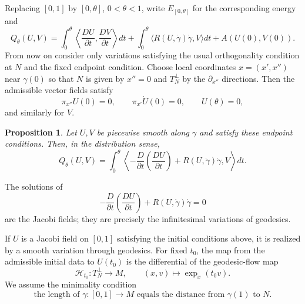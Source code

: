 \documentclass[11pt,a4paper]{article}
\numberwithin{equation}{section}
\newtheorem{proposition}[theorem]{Proposition}
\theoremstyle{remark}
\begin{document}
Replacing $[0,1]$ by $[0,\theta]$, $0<\theta<1$, write $E_{[0,\theta]}$ for the corresponding energy and
\begin{equation}
Q_\theta(U,V)=
\int_0^\theta\left\langle\frac{D U}{\partial t},\frac{D V}{\partial t}\right\rangle dt
+\int_0^\theta\langle R(U,\dot\gamma)\dot\gamma,V\rangle dt
+A(U(0),V(0)).
\tag{6.4}
\end{equation}
From now on consider only variations satisfying the usual orthogonality condition at $N$ and the fixed endpoint condition. Choose local coordinates $x=(x',x'')$ near $\gamma(0)$ so that $N$ is given by $x''=0$ and $T_N^\perp$ by the $\partial_{x''}$ directions. Then the admissible vector fields satisfy
\[
\pi_{x''}U(0)=0,
\qquad \pi_{x'}\dot U(0)=0,
\qquad U(\theta)=0,
\]
and similarly for $V$.

\begin{proposition}
Let $U,V$ be piecewise smooth along $\gamma$ and satisfy these endpoint conditions. Then, in the distribution sense,
\begin{equation}
Q_\theta(U,V)=
\int_0^\theta
\left\langle
-\frac{D}{\partial t}\left(\frac{DU}{\partial t}\right)
+R(U,\dot\gamma)\dot\gamma,
V\right\rangle dt.
\tag{6.4$'$}
\end{equation}
\end{proposition}
The solutions of
\begin{equation}
-\frac{D}{\partial t}\left(\frac{DU}{\partial t}\right)
+R(U,\dot\gamma)\dot\gamma=0
\tag{6.5}
\end{equation}
are the Jacobi fields; they are precisely the infinitesimal variations of geodesics.

If $U$ is a Jacobi field on $[0,1]$ satisfying the initial conditions above, it is realized by a smooth variation through geodesics. For fixed $t_0$, the map from the admissible initial data to $U(t_0)$ is the differential of the geodesic-flow map
\[
\mathcal H_{t_0}:T_N^\perp\longrightarrow M,
\qquad (x,v)\longmapsto\exp_x(t_0v).
\]
We assume the minimality condition
\begin{equation}
\text{the length of }\gamma:[0,1]\to M
\text{ equals the distance from }\gamma(1)\text{ to }N.
\tag{6.6}
\end{equation}
\end{document}
